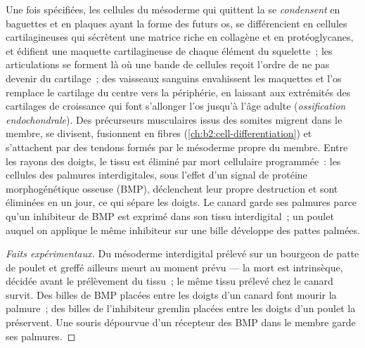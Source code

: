 \begin{proposition}[Du plan à l'os]\label{prop:b2:limb-organogenesis:skeleton}
Une fois spécifiées, les cellules du mésoderme qui quittent la  se \emph{condensent} en baguettes et en plaques ayant la
forme des futurs os, se différencient en cellules cartilagineuses qui
sécrètent une matrice riche en collagène et en protéoglycanes, et
édifient une maquette cartilagineuse de chaque élément du squelette~;
les articulations se forment là où une bande de cellules reçoit
l'ordre de ne pas devenir du cartilage~; des vaisseaux sanguins envahissent
les maquettes et l'os remplace le cartilage du centre vers la
périphérie, en laissant aux extrémités des cartilages de croissance qui
font s'allonger l'os jusqu'à l'âge adulte (\emph{ossification
endochondrale}). Des précurseurs musculaires issus des somites migrent
dans le membre, se divisent, fusionnent en fibres
(\cref{ch:b2:cell-differentiation}) et s'attachent par des tendons
formés par le mésoderme propre du membre. Entre les rayons des doigts,
le tissu est éliminé par mort cellulaire programmée~: les cellules des
palmures interdigitales, sous l'effet d'un signal de protéine
morphogénétique osseuse (BMP), déclenchent leur propre destruction et
sont éliminées en un jour, ce qui sépare les doigts. Le canard garde ses
palmures parce qu'un inhibiteur de BMP est exprimé dans son tissu
interdigital~; un poulet auquel on applique le même inhibiteur sur une
bille développe des pattes palmées.
\end{proposition}
\begin{proof}[Faits expérimentaux]
Du mésoderme interdigital prélevé sur un bourgeon de patte de poulet et
greffé ailleurs meurt au moment prévu --- la mort est intrinsèque,
décidée avant le prélèvement du tissu~; le même tissu prélevé chez le
canard survit. Des billes de BMP placées entre les doigts d'un canard
font mourir la palmure~; des billes de l'inhibiteur gremlin placées
entre les doigts d'un poulet la préservent. Une souris dépourvue d'un
récepteur des BMP dans le membre garde ses palmures.
\end{proof}


